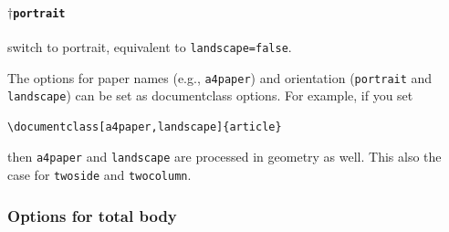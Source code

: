 \documentclass[a4paper,oneside]{book}
\begin{document}
\paragraph{$\dag$\texttt{portrait}} switch to portrait, equivalent to \texttt{landscape=false}.

The options for paper names (e.g., \texttt{a4paper}) and orientation (\texttt{portrait} and \texttt{landscape}) can be set as documentclass options. For example, if you set \begin{verbatim}\documentclass[a4paper,landscape]{article}\end{verbatim} then \texttt{a4paper} and \texttt{landscape} are processed in \textsf{geometry} as well. This also the case for \texttt{twoside} and \texttt{twocolumn}.

\subsubsection{Options for total body}
\end{document}
